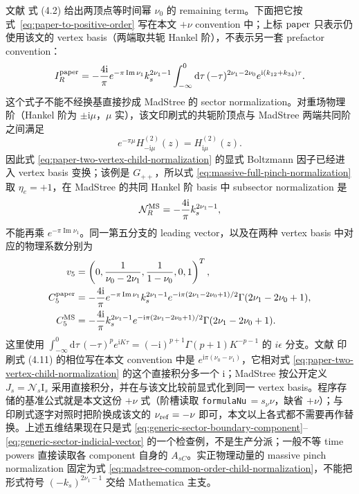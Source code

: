\documentclass[11pt,a4paper]{ctexart}
\newcommand{\dd}{\mathrm d}
\newcommand{\ii}{\mathrm i}
\newcommand{\cN}{\mathcal N}
\begin{document}
文献 \cite{Chen:2024jms} 式 (4.2) 给出两顶点等时间幂 $\nu_0$ 的 remaining term。下面把它按式~\eqref{eq:paper-to-positive-order} 写在本文 $+\nu$ convention 中；上标 ${\rm paper}$ 只表示仍使用该文的 vertex basis（两端取共轭 Hankel 阶），不表示另一套 prefactor convention：
\begin{equation}
 I_R^{\rm paper}=-\frac{4\ii}{\pi}e^{-\pi\operatorname{Im}\nu_1}k_s^{2\nu_1-1}
 \int_{-\infty}^{0}\dd\tau\,(-\tau)^{2\nu_1-2\nu_0}
 e^{\ii(k_{12}+k_{34})\tau}.
 \label{eq:paper-two-vertex-child-normalization}
\end{equation}
这个式子不能不经换基直接抄成 MadStree 的 sector normalization。对重场物理阶（Hankel 阶为 $\pm\ii\mu$，$\mu$ 实），该文印刷式的共轭阶顶点与 MadStree 两端共同阶之间满足
\begin{equation}
 e^{-\pi\mu}H^{(2)}_{-\ii\mu}(z)=H^{(2)}_{\ii\mu}(z).
 \label{eq:paper-endpoint-to-common-hankel-order}
\end{equation}
因此式 \eqref{eq:paper-two-vertex-child-normalization} 的显式 Boltzmann 因子已经进入 vertex basis 变换；该例是 $G_{++}$，所以式 \eqref{eq:massive-full-pinch-normalization} 取 $\eta_e=+1$，在 MadStree 的共同 Hankel 阶 basis 中 subsector normalization 是
\begin{equation}
 \cN_R^{\rm MS}=-\frac{4\ii}{\pi}k_s^{2\nu_1-1},
 \label{eq:madstree-common-order-child-normalization}
\end{equation}
不能再乘 $e^{-\pi\operatorname{Im}\nu_1}$。同一第五分支的 leading vector，以及在两种 vertex basis 中对应的物理系数分别为
\begin{align}
 v_5&=\left(0,\frac{1}{\nu_0-2\nu_1},\frac{1}{1-\nu_0},0,1\right)^T,
 \notag\\
 C_5^{\rm paper}&=-\frac{4\ii}{\pi}e^{-\pi\operatorname{Im}\nu_1}
 k_s^{2\nu_1-1}e^{-\ii\pi(2\nu_1-2\nu_0+1)/2}
 \Gamma(2\nu_1-2\nu_0+1),
 \notag\\
 C_5^{\rm MS}&=-\frac{4\ii}{\pi}
 k_s^{2\nu_1-1}e^{-\ii\pi(2\nu_1-2\nu_0+1)/2}
 \Gamma(2\nu_1-2\nu_0+1).
 \label{eq:paper-two-vertex-contact-boundary}
\end{align}
这里使用 $\int_{-\infty}^{0}\dd\tau\,(-\tau)^p e^{\ii K\tau}=(-\ii)^{p+1}\Gamma(p+1)K^{-p-1}$ 的 $i\epsilon$ 分支。文献 \cite{Chen:2024jms} 印刷式 (4.11) 的相位写在本文 convention 中是 $e^{\ii\pi(\nu_0-\nu_1)}$，它相对式 \eqref{eq:paper-two-vertex-child-normalization} 的这个直接积分多一个 $\ii$；MadStree 按公开定义 $J_s=\cN_s \text{I}_s$ 采用直接积分，并在与该文比较前显式化到同一 vertex basis。程序存储的基准公式就是本文这份 $+\nu$ 式（阶槽读取 \texttt{formulaNu}$\,=s_\nu\nu$，缺省 $+\nu$）；与 \cite{Chen:2024jms} 印刷式逐字对照时把阶换成该文的 $\nu_{\rm ref}=-\nu$ 即可，本文以上各式都不需要再作替换。上述五维结果现在只是式 \eqref{eq:generic-sector-boundary-component}--\eqref{eq:generic-sector-indicial-vector} 的一个检查例，不是生产分派；一般不等 time powers 直接读取各 component 自身的 $A_{sC}$。实正物理动量的 massive pinch normalization 固定为式 \eqref{eq:madstree-common-order-child-normalization}，不能把形式符号 $(-k_s)^{2\nu_1-1}$ 交给 Mathematica 主支。
\end{document}
